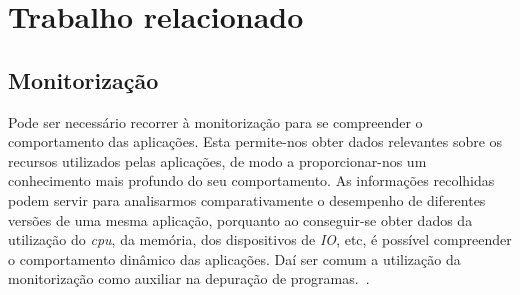 \chapter{Trabalho relacionado}
\label{cap:trabrelacionado}

 
% 
% 


\section{Monitorização} \label{sect:descricao}

Pode ser necessário recorrer à monitorização para se compreender o comportamento das aplicações.
Esta permite-nos obter dados relevantes sobre os recursos utilizados pelas aplicações, de modo a proporcionar-nos um conhecimento mais profundo do seu comportamento.
As informações recolhidas podem servir para analisarmos comparativamente o desempenho de diferentes versões de uma mesma aplicação, porquanto ao conseguir-se obter dados da utilização do \textit{cpu}, da memória, dos dispositivos de \textit{IO}, etc, é possível compreender o comportamento dinâmico das aplicações.
Daí ser comum a utilização da monitorização como auxiliar na depuração de programas.~\cite{DuartePhd05}.

